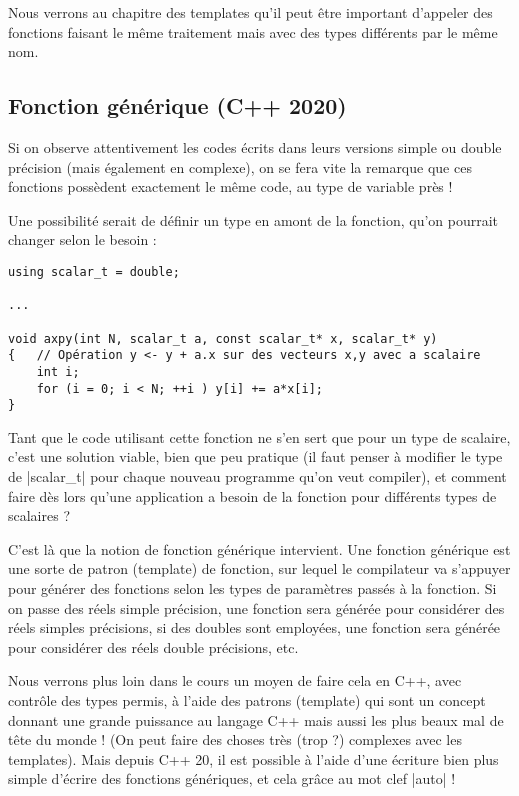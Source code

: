 \begin{itemize}
Nous verrons au chapitre des templates qu'il peut être important d'appeler des fonctions faisant le même traitement mais avec des types différents par le même nom.

\subsection{Fonction générique (C++ 2020)}

Si on observe attentivement les codes écrits dans leurs versions simple ou double précision
(mais également en complexe), on se fera vite la remarque que ces fonctions possèdent exactement le même code, au type de variable près !

Une possibilité serait de définir un type en amont de la fonction, qu'on pourrait changer selon le besoin :
\begin{lstlisting}
using scalar_t = double;

...

void axpy(int N, scalar_t a, const scalar_t* x, scalar_t* y)
{   // Opération y <- y + a.x sur des vecteurs x,y avec a scalaire
    int i;
    for (i = 0; i < N; ++i ) y[i] += a*x[i];
}
\end{lstlisting}

Tant que le code utilisant cette fonction ne s'en sert que pour un type de scalaire, c'est une solution viable, bien que peu pratique (il faut penser à modifier le type de |scalar_t| pour chaque nouveau programme qu'on veut compiler), et comment faire dès lors qu'une application a besoin de la fonction pour différents types de scalaires ?

C'est là que la notion de fonction générique intervient. Une fonction générique est une sorte de patron (template) de fonction, sur lequel le compilateur va s'appuyer pour générer des fonctions selon les types de paramètres passés à la fonction. Si on passe des réels simple précision, une fonction sera générée pour considérer des réels simples précisions,
si des doubles sont employées, une fonction sera générée pour considérer des réels double précisions, etc.

Nous verrons plus loin dans le cours un moyen de faire cela en C++, avec contrôle des types permis, à l'aide des patrons (template) qui sont un concept donnant une grande puissance au langage C++ mais aussi les plus beaux mal de tête du monde ! (On peut faire des choses très (trop ?) complexes avec les templates). Mais depuis C++ 20, il est possible à l'aide d'une écriture bien plus simple d'écrire des fonctions génériques, et cela grâce au mot clef |auto| !


\end{itemize}
